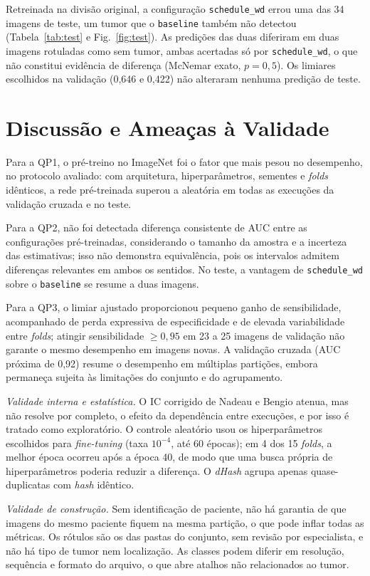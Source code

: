 \documentclass[conference]{IEEEtran}
\begin{document}
Retreinada na divisão original, a configuração \texttt{schedule\_wd} errou uma das 34 imagens de teste, um tumor que o \texttt{baseline} também não detectou (Tabela~\ref{tab:test} e Fig.~\ref{fig:test}). As predições das duas diferiram em duas imagens rotuladas como sem tumor, ambas acertadas só por \texttt{schedule\_wd}, o que não constitui evidência de diferença (McNemar exato, $p=0{,}5$). Os limiares escolhidos na validação (0,646 e 0,422) não alteraram nenhuma predição de teste.



\section{Discussão e Ameaças à Validade}

Para a QP1, o pré-treino no ImageNet foi o fator que mais pesou no desempenho, no protocolo avaliado: com arquitetura, hiperparâmetros, sementes e \textit{folds} idênticos, a rede pré-treinada superou a aleatória em todas as execuções da validação cruzada e no teste.

Para a QP2, não foi detectada diferença consistente de AUC entre as configurações pré-treinadas, considerando o tamanho da amostra e a incerteza das estimativas; isso não demonstra equivalência, pois os intervalos admitem diferenças relevantes em ambos os sentidos. No teste, a vantagem de \texttt{schedule\_wd} sobre o \texttt{baseline} se resume a duas imagens.

Para a QP3, o limiar ajustado proporcionou pequeno ganho de sensibilidade, acompanhado de perda expressiva de especificidade e de elevada variabilidade entre \textit{folds}; atingir sensibilidade $\ge0{,}95$ em 23 a 25 imagens de validação não garante o mesmo desempenho em imagens novas. A validação cruzada (AUC próxima de 0,92) resume o desempenho em múltiplas partições, embora permaneça sujeita às limitações do conjunto e do agrupamento.

\textit{Validade interna e estatística.} O IC corrigido de Nadeau e Bengio atenua, mas não resolve por completo, o efeito da dependência entre execuções, e por isso é tratado como exploratório. O controle aleatório usou os hiperparâmetros escolhidos para \textit{fine-tuning} (taxa $10^{-4}$, até 60 épocas); em 4 dos 15 \textit{folds}, a melhor época ocorreu após a época 40, de modo que uma busca própria de hiperparâmetros poderia reduzir a diferença. O \textit{dHash} agrupa apenas quase-duplicatas com \textit{hash} idêntico.

\textit{Validade de construção.} Sem identificação de paciente, não há garantia de que imagens do mesmo paciente fiquem na mesma partição, o que pode inflar todas as métricas. Os rótulos são os das pastas do conjunto, sem revisão por especialista, e não há tipo de tumor nem localização. As classes podem diferir em resolução, sequência e formato do arquivo, o que abre atalhos não relacionados ao tumor.
\end{document}
